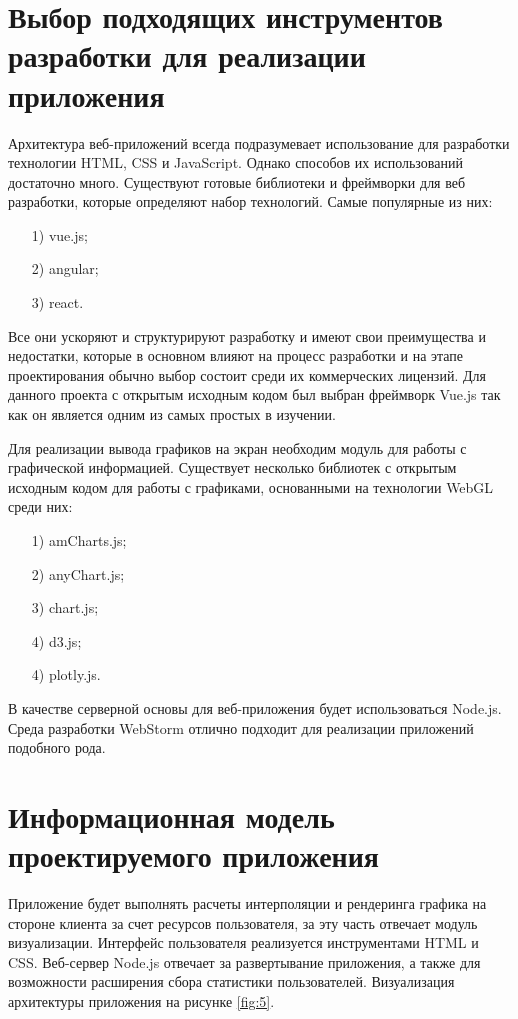 \section{Выбор подходящих инструментов разработки для реализации приложения}

Архитектура веб-приложений всегда подразумевает использование для разработки технологии HTML, CSS и JavaScript. Однако способов их использований достаточно много. Существуют готовые библиотеки и фреймворки для веб разработки, которые определяют набор технологий. Самые популярные из них:
\begin{enumerate}
    \item [1)] vue.js;
    \item [2)] angular;
    \item [3)] react.
\end{enumerate}

Все они ускоряют и структурируют разработку и имеют свои преимущества и недостатки, которые в основном влияют на процесс разработки и на этапе проектирования обычно выбор состоит среди их коммерческих лицензий. Для данного проекта с открытым исходным кодом был выбран фреймворк Vue.js так как он является одним из самых простых в изучении. 

Для реализации вывода графиков на экран необходим модуль для работы с графической информацией. Существует несколько библиотек с открытым исходным кодом для работы с графиками, основанными на технологии WebGL среди них: 

\begin{enumerate}
    \item [1)] amCharts.js;
    \item [2)] anyChart.js;
    \item [3)] chart.js;
    \item [4)] d3.js;
    \item [4)] plotly.js.
\end{enumerate}
В качестве серверной основы для веб-приложения будет использоваться Node.js. Среда разработки WebStorm отлично подходит для реализации приложений подобного рода.

\section{Информационная модель проектируемого приложения}
Приложение будет выполнять расчеты интерполяции и рендеринга графика на стороне клиента за счет ресурсов пользователя, за эту часть отвечает модуль визуализации. Интерфейс пользователя реализуется инструментами HTML и CSS. Веб-сервер Node.js отвечает за развертывание приложения, а также для возможности расширения сбора статистики пользователей. Визуализация архитектуры приложения на рисунке \ref{fig:5}.

